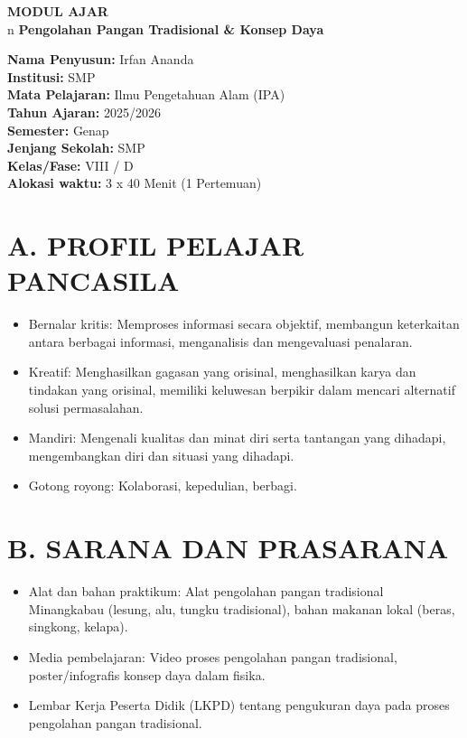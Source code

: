\documentclass[12pt,a4paper]{article}
\begin{document}
\begin{center}
{\Huge\textbf{MODUL AJAR}}\\n\vspace{0.5cm}
{\Large\textbf{Pengolahan Pangan Tradisional \& Konsep Daya}}
\end{center}

\vspace{1cm}

\begin{tcolorbox}[colback=white,colframe=black,boxrule=1pt]
\textbf{Nama Penyusun:} Irfan Ananda\\
\textbf{Institusi:} SMP\\
\textbf{Mata Pelajaran:} Ilmu Pengetahuan Alam (IPA)\\
\textbf{Tahun Ajaran:} 2025/2026\\
\textbf{Semester:} Genap\\
\textbf{Jenjang Sekolah:} SMP\\
\textbf{Kelas/Fase:} VIII / D\\
\textbf{Alokasi waktu:} 3 x 40 Menit (1 Pertemuan)
\end{tcolorbox}

\section*{A. PROFIL PELAJAR PANCASILA}
\begin{itemize}[leftmargin=*]
    \item Bernalar kritis: Memproses informasi secara objektif, membangun keterkaitan antara berbagai informasi, menganalisis dan mengevaluasi penalaran.
    \item Kreatif: Menghasilkan gagasan yang orisinal, menghasilkan karya dan tindakan yang orisinal, memiliki keluwesan berpikir dalam mencari alternatif solusi permasalahan.
    \item Mandiri: Mengenali kualitas dan minat diri serta tantangan yang dihadapi, mengembangkan diri dan situasi yang dihadapi.
    \item Gotong royong: Kolaborasi, kepedulian, berbagi.
\end{itemize}

\section*{B. SARANA DAN PRASARANA}
\begin{itemize}[leftmargin=*]
    \item Alat dan bahan praktikum: Alat pengolahan pangan tradisional Minangkabau (lesung, alu, tungku tradisional), bahan makanan lokal (beras, singkong, kelapa).
    \item Media pembelajaran: Video proses pengolahan pangan tradisional, poster/infografis konsep daya dalam fisika.
    \item Lembar Kerja Peserta Didik (LKPD) tentang pengukuran daya pada proses pengolahan pangan tradisional.
\end{itemize}
\end{document}
